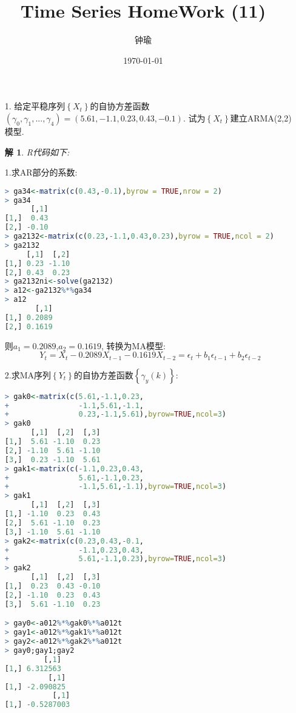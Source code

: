 \documentclass[11pt,a4paper]{ctexart}
\title{Time Series HomeWork (11)}
\author{钟瑜 \quad 222018314210044}
\date{\today}
\newtheorem*{solution}{解}
\begin{document}
\maketitle
\pagestyle{plain}%
\begin{enumerate}
	
\item[1.] 给定平稳序列$ \left\lbrace X_t \right\rbrace  $的自协方差函数
$ (\gamma_0,\gamma_1,...,\gamma_4)=(5.61,-1.1,0.23,0.43,-0.1) $.
试为$ \left\lbrace X_t \right\rbrace $建立ARMA(2,2)模型.
\begin{solution}
R代码如下:
\end{solution}

1.求AR部分的系数:
\begin{lstlisting}[language=r]
> ga34<-matrix(c(0.43,-0.1),byrow = TRUE,nrow = 2)
> ga34
      [,1]
[1,]  0.43
[2,] -0.10
> ga2132<-matrix(c(0.23,-1.1,0.43,0.23),byrow = TRUE,ncol = 2)
> ga2132
     [,1]  [,2]
[1,] 0.23 -1.10
[2,] 0.43  0.23
> ga2132ni<-solve(ga2132)
> a12<-ga2132%*%ga34
> a12
       [,1]
[1,] 0.2089
[2,] 0.1619

\end{lstlisting}
则$ a_1=0.2089 $,$ a_2=0.1619 $,
转换为MA模型: $$Y_t=X_t-0.2089X_{t-1}-0.1619X_{t-2}=\epsilon_t+b_1\epsilon_{t-1}+b_2\epsilon_{t-2}$$


2.求MA序列$ \left\lbrace Y_t \right\rbrace  $的自协方差函数$ \left\lbrace \gamma_y(k) \right\rbrace  $:
\begin{lstlisting}[language=r]
> gak0<-matrix(c(5.61,-1.1,0.23,
+                -1.1,5.61,-1.1,
+                0.23,-1.1,5.61),byrow=TRUE,ncol=3)
> gak0
      [,1]  [,2]  [,3]
[1,]  5.61 -1.10  0.23
[2,] -1.10  5.61 -1.10
[3,]  0.23 -1.10  5.61
> gak1<-matrix(c(-1.1,0.23,0.43,
+                5.61,-1.1,0.23,
+                -1.1,5.61,-1.1),byrow=TRUE,ncol=3)
> gak1
      [,1]  [,2]  [,3]
[1,] -1.10  0.23  0.43
[2,]  5.61 -1.10  0.23
[3,] -1.10  5.61 -1.10
> gak2<-matrix(c(0.23,0.43,-0.1,
+                -1.1,0.23,0.43,
+                5.61,-1.1,0.23),byrow=TRUE,ncol=3)
> gak2
      [,1]  [,2]  [,3]
[1,]  0.23  0.43 -0.10
[2,] -1.10  0.23  0.43
[3,]  5.61 -1.10  0.23

> gay0<-a012%*%gak0%*%a012t
> gay1<-a012%*%gak1%*%a012t
> gay2<-a012%*%gak2%*%a012t
> gay0;gay1;gay2
         [,1]
[1,] 6.312563
          [,1]
[1,] -2.090825
           [,1]
[1,] -0.5287003
\end{lstlisting}


\end{enumerate}
\end{document}
